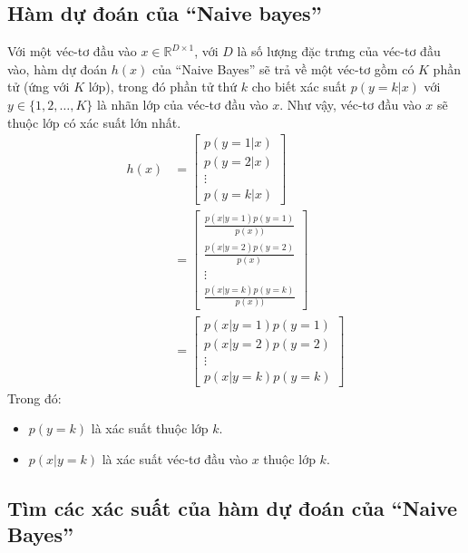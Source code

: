 \subsection{Hàm dự đoán của ``Naive bayes''}
Với một véc-tơ đầu vào $x \in \mathbb{R}^{D\times 1}$, với $D$ là số lượng đặc trưng của véc-tơ đầu vào, hàm dự đoán $h(x)$ của ``Naive Bayes'' sẽ trả về một véc-tơ gồm có $K$ phần tử (ứng với $K$ lớp), trong đó phần tử thứ $k$ cho biết xác suất $p(y=k|x)$ với $y \in \{1,2,\dots,K\}$ là nhãn lớp của véc-tơ đầu vào $x$. Như vậy, véc-tơ đầu vào $x$ sẽ thuộc lớp có xác suất lớn nhất.
\begin{equation}\label{eq:2.3_hx}
    \begin{split}
        h(x) &= 
        \begin{bmatrix}
            p(y=1|x)\\
            p(y=2|x)\\
            \vdots\\
            p(y=k|x)
        \end{bmatrix}\\
        &= 
        \begin{bmatrix}
            \frac{p(x|y=1)p(y=1)}{p(x))}\\
            \frac{p(x|y=2)p(y=2)}{p(x)}\\
            \vdots\\
            \frac{p(x|y=k)p(y=k)}{p(x))}
        \end{bmatrix}\\
        &=
        \begin{bmatrix}
            p(x|y=1)p(y=1)\\
            p(x|y=2)p(y=2)\\
            \vdots\\
            p(x|y=k)p(y=k)
        \end{bmatrix}
    \end{split}
\end{equation}
Trong đó:
\begin{itemize}
    \item $p(y=k)$ là xác suất thuộc lớp $k$.
    \item $p(x|y=k)$ là xác suất véc-tơ đầu vào $x$ thuộc lớp $k$.
\end{itemize}

\subsection{Tìm các xác suất của hàm dự đoán của ``Naive Bayes''}
